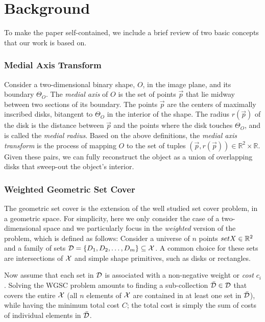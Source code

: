 \documentclass[10pt,twocolumn,letterpaper]{article}
\begin{document}
\section{Background}\label{sec:background}
To make the paper self-contained, we include a brief review of two basic concepts that our work is based on.

\subsubsection*{Medial Axis Transform}
Consider a two-dimensional binary shape, $O$, in the image plane, and its boundary $\Theta_O$.
The \emph{medial axis} of $O$ is the set of points $\vec{p}$ that lie midway between two sections of 
its boundary. The points $\vec{p}$ are the centers of maximally inscribed disks, bitangent to $\Theta_O$
in the interior of the shape. The radius $r(\vec{p})$ of the disk is the distance between $\vec{p}$ and 
the points where the disk touches $\Theta_O$, and is called the \emph{medial radius}.
Based on the above definitions, the \emph{medial axis transform} is the process of 
mapping $O$ to the set of tuples $(\vec{p},r(\vec{p})) \in \mathbb{R}^2 \times \mathbb{R}$.
Given these pairs, we can fully reconstruct the object as a union of overlapping disks that sweep-out 
the object's interior. 

\subsubsection*{Weighted Geometric Set Cover}
The geometric set cover is the extension of the well studied set cover problem, in a geometric space.
For simplicity, here we only consider the case of a two-dimensional space and we particularly focus in the 
\emph{weighted} version of the problem, which is defined as follows:
Consider a universe of $n$ points $set{X} \in \mathbb{R}^2$ and a family of sets 
$\mathcal{D} = \{D_1,D_2,\ldots,D_m\} \subseteq \mathcal{X}$. 
A common choice for these sets are intersections of $\mathcal{X}$ and simple shape primitives, such as disks or rectangles.

Now assume that each set in $\mathcal{D}$ is associated with a non-negative weight or \emph{cost} $c_i$.
Solving the WGSC problem amounts to finding a sub-collection $\bar{\mathcal{D}} \in \mathcal{D}$ that covers the entire $\mathcal{X}$
(all $n$ elements of $\mathcal{X}$ are contained in at least one set in $\bar{\mathcal{D}}$), while having the minimum
total cost $C$; the total cost is simply the sum of costs of individual elements in $\bar{\mathcal{D}}$.
\end{document}
